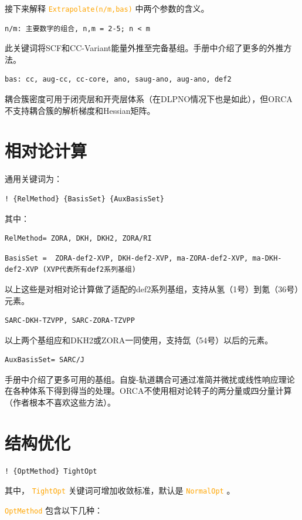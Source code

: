 \documentclass{ctexart}
\newcommand{\cmd}[1]{\textcolor{orange}{ \texttt{#1} }}
\begin{document}
	
	接下来解释\cmd{Extrapolate(n/m,bas)}中两个参数的含义。
	\begin{lstlisting}
n/m: 主要数字的组合, n,m = 2-5; n < m
	\end{lstlisting}
	
	此关键词将SCF和CC-Variant能量外推至完备基组。手册中介绍了更多的外推方法。
	\begin{lstlisting}
bas: cc, aug-cc, cc-core, ano, saug-ano, aug-ano, def2
	\end{lstlisting}
	耦合簇密度可用于闭壳层和开壳层体系（在DLPNO情况下也是如此），但ORCA不支持耦合簇的解析梯度和Hessian矩阵。
	
	\section{相对论计算} 
	通用关键词为：
	\begin{lstlisting}
! {RelMethod} {BasisSet} {AuxBasisSet}
	\end{lstlisting}
	
	其中：
	\begin{lstlisting}
RelMethod= ZORA, DKH, DKH2, ZORA/RI
	\end{lstlisting}
	\begin{lstlisting}
BasisSet =	ZORA-def2-XVP, DKH-def2-XVP, ma-ZORA-def2-XVP, ma-DKH-def2-XVP (XVP代表所有def2系列基组)
	\end{lstlisting}
	以上这些是对相对论计算做了适配的def2系列基组，支持从氢（1号）到氪（36号）元素。
	
	\begin{lstlisting}
SARC-DKH-TZVPP, SARC-ZORA-TZVPP
	\end{lstlisting}
	以上两个基组应和DKH2或ZORA一同使用，支持氙（54号）以后的元素。
	\begin{lstlisting}
AuxBasisSet= SARC/J
	\end{lstlisting}
	手册中介绍了更多可用的基组。自旋-轨道耦合可通过准简并微扰或线性响应理论在各种体系下得到得当的处理。ORCA不使用相对论转子的两分量或四分量计算（作者根本不喜欢这些方法）。
	
	\section{结构优化} 
	\begin{lstlisting}
! {OptMethod} TightOpt
	\end{lstlisting}
	
	其中，\cmd{TightOpt}关键词可增加收敛标准，默认是\cmd{NormalOpt}。
	
	\cmd{OptMethod} 包含以下几种：
	
\end{document}
